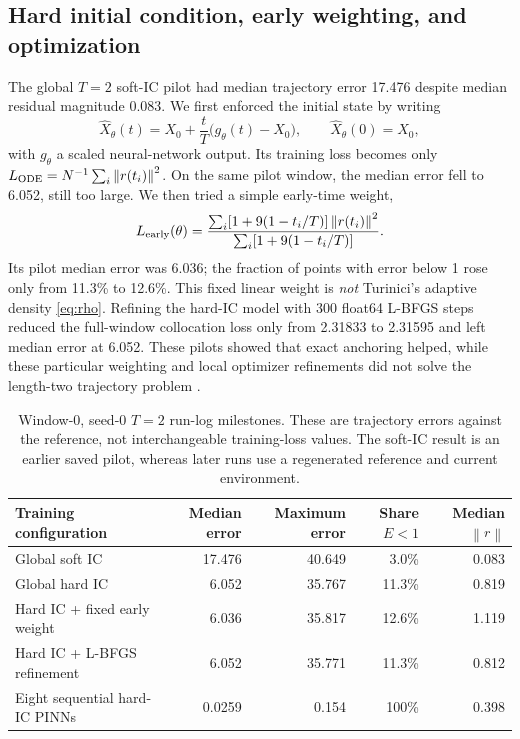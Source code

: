 \documentclass[11pt,a4paper]{article}
\newcommand{\norm}[1]{\left\lVert #1\right\rVert}
\begin{document}
\subsection{Hard initial condition, early weighting, and optimization}
The global $T=2$ soft-IC pilot had median trajectory error 17.476 despite median residual magnitude 0.083. We first enforced the initial state by writing
\begin{equation}\label{eq:hardic}
\widehat X_\theta(t)=X_0+\frac{t}{T}\bigl(g_\theta(t)-X_0\bigr),
\qquad \widehat X_\theta(0)=X_0,
\end{equation}
with $g_\theta$ a scaled neural-network output. Its training loss becomes only $L_{\rm ODE}=N^{-1}\sum_i\norm{r(t_i)}^2$. On the same pilot window, the median error fell to 6.052, still too large. We then tried a simple early-time weight,
\begin{equation}\label{eq:earlyweight}
L_{\rm early}(\theta)=\frac{\sum_i[1+9(1-t_i/T)]\norm{r(t_i)}^2}
{\sum_i[1+9(1-t_i/T)]}.
\end{equation}
Its pilot median error was 6.036; the fraction of points with error below 1 rose only from 11.3\% to 12.6\%. This fixed linear weight is \emph{not} Turinici's adaptive density \eqref{eq:rho}. Refining the hard-IC model with 300 float64 L-BFGS steps reduced the full-window collocation loss only from 2.31833 to 2.31595 and left median error at 6.052. These pilots showed that exact anchoring helped, while these particular weighting and local optimizer refinements did not solve the length-two trajectory problem \cite{modelprogress}.
\begin{table}[H]\centering\small
\caption{Window-0, seed-0 $T=2$ run-log milestones. These are trajectory errors against the reference, not interchangeable training-loss values. The soft-IC result is an earlier saved pilot, whereas later runs use a regenerated reference and current environment.}\label{tab:milestones}
\begin{tabular}{@{}lrrrr@{}}\toprule
Training configuration & Median error & Maximum error & Share $E<1$ & Median $\norm r$\\\midrule
Global soft IC & 17.476 & 40.649 & 3.0\% & 0.083\\
Global hard IC & 6.052 & 35.767 & 11.3\% & 0.819\\
Hard IC + fixed early weight & 6.036 & 35.817 & 12.6\% & 1.119\\
Hard IC + L-BFGS refinement & 6.052 & 35.771 & 11.3\% & 0.812\\
Eight sequential hard-IC PINNs & 0.0259 & 0.154 & 100\% & 0.398\\\bottomrule
\end{tabular}
\end{table}
\end{document}
